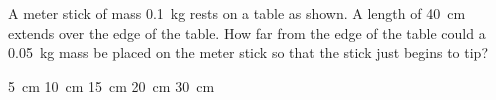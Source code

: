 \documentclass{../../../oss-classkick-exam}
\begin{document}
\genheader


\genmultidirections

\gengravity

\raggedcolumns
\begin{multicols*}{2}
  \begin{questions}

    
    \question A meter stick of mass \SI{.1}{\kilo\gram} rests on a table as
    shown. A length of \SI{40}{\centi\metre} extends over the edge of the table.
    How far from the edge of the table could a \SI{.05}{\kilo\gram} mass be
    placed on the meter stick so that the stick just begins to tip?
    \begin{center}
    \end{center}
    \begin{choices}
      \choice\SI{5}{\centi\metre}
      \choice\SI{10}{\centi\metre}
      \choice\SI{15}{\centi\metre}
      \choice\SI{20}{\centi\metre}
      \choice\SI{30}{\centi\metre}
    \end{choices}
    
    

\end{questions}
\end{multicols*}
\end{document}
